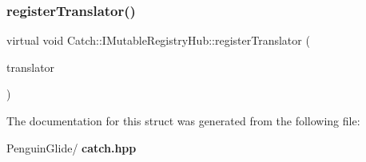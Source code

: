 \mbox{\label{struct_catch_1_1_i_mutable_registry_hub_ae6825365102693cf7707db022a2c2b49}} 
\subsubsection{registerTranslator()}
{\footnotesize\ttfamily virtual void Catch\+::\+I\+Mutable\+Registry\+Hub\+::register\+Translator (\begin{DoxyParamCaption}\item[{const \textbf{ I\+Exception\+Translator} $\ast$}]{translator }\end{DoxyParamCaption})\hspace{0.3cm}{\ttfamily [pure virtual]}}



The documentation for this struct was generated from the following file\+:\begin{DoxyCompactItemize}
\item 
Penguin\+Glide/\textbf{ catch.\+hpp}\end{DoxyCompactItemize}
